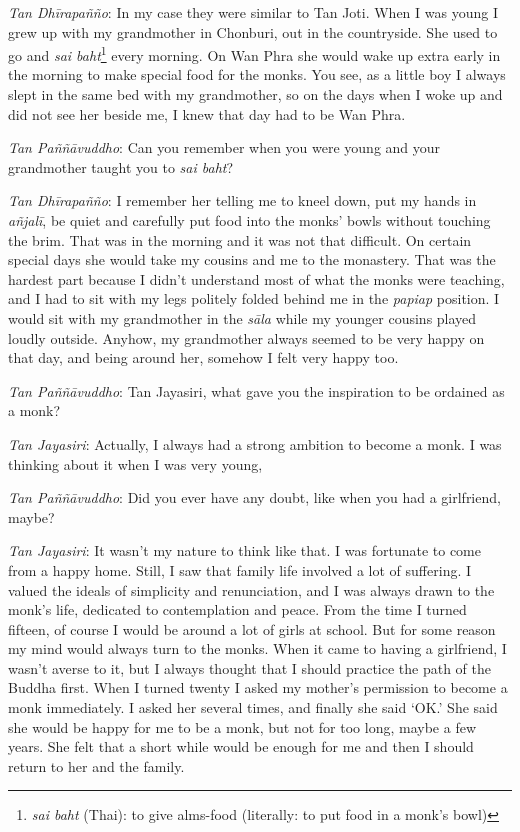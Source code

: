 \emph{Tan Dhīrapañño}: In my case they were similar to Tan Joti. When I
was young I grew up with my grandmother in Chonburi, out in the
countryside. She used to go and \emph{sai baht}\footnote{\emph{sai baht}
(Thai): to give alms-food (literally: to put food in a monk's bowl)}
every morning. On Wan Phra she would wake up extra early in the morning
to make special food for the monks. You see, as a little boy I always
slept in the same bed with my grandmother, so on the days when I woke up
and did not see her beside me, I knew that day had to be Wan Phra. 

\emph{Tan Paññāvuddho}: Can you remember when you were young and your
grandmother taught you to \emph{sai baht}? 

\emph{Tan Dhīrapañño}: I remember her telling me to kneel down, put my
hands in \emph{añjalī}, be quiet and carefully put food into the monks'
bowls without touching the brim. That was in the morning and it was not
that difficult. On certain special days she would take my cousins and me
to the monastery. That was the hardest part because I didn't understand
most of what the monks were teaching, and I had to sit with my legs
politely folded behind me in the \emph{papiap} position. I would sit
with my grandmother in the \emph{sāla} while my younger cousins played
loudly outside. Anyhow, my grandmother always seemed to be very happy on
that day, and being around her, somehow I felt very happy too. 

\emph{Tan Paññāvuddho}: Tan Jayasiri, what gave you the inspiration to
be ordained as a monk? 

\emph{Tan Jayasiri}: Actually, I always had a strong ambition to become
a monk. I was thinking about it when I was very young, 

\emph{Tan Paññāvuddho}: Did you ever have any doubt, like when you had
a girlfriend, maybe? 

\emph{Tan Jayasiri}: It wasn't my nature to think like that. I was
fortunate to come from a happy home. Still, I saw that family life
involved a lot of suffering. I valued the ideals of simplicity and
renunciation, and I was always drawn to the monk's life, dedicated to
contemplation and peace. From the time I turned fifteen, of course I
would be around a lot of girls at school. But for some reason my mind
would always turn to the monks. When it came to having a girlfriend, I
wasn't averse to it, but I always thought that I should practice the
path of the Buddha first. When I turned twenty I asked my mother's
permission to become a monk immediately. I asked her several times, and
finally she said `OK.' She said she would be happy for me to be a
monk, but not for too long, maybe a few years. She felt that a short
while would be enough for me and then I should return to her and the
family. 

